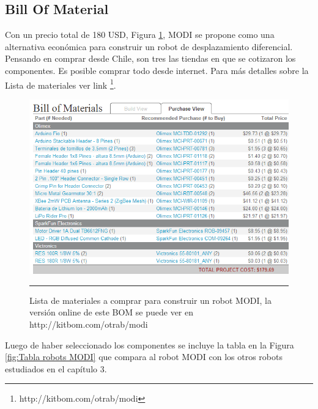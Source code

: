 
\subsection{Bill Of Material}

Con un precio total de 180 USD, Figura \ref{fig:BOM}, MODI se propone como una alternativa económica para construir un robot de desplazamiento diferencial. Pensando en comprar desde Chile, son tres las tiendas en que se cotizaron los componentes. Es posible comprar todo desde internet. Para más detalles sobre la Lista de materiales ver link \footnote{http://kitbom.com/otrab/modi}.
\begin{figure}[htbp]
	\centering
		\includegraphics[width=\textwidth]{./Figures/MODI/kitbom.png}
		\rule{35em}{0.5pt}
	\caption[Bill Of Materials]{Lista de materiales a comprar para construir un robot MODI, la versión online de este BOM se puede ver en http://kitbom.com/otrab/modi}
	\label{fig:BOM}
\end{figure}

Luego de haber seleccionado los componentes se incluye la tabla en la Figura \ref{fig:Tabla robots MODI} que compara al robot MODI con los otros robots estudiados en el capítulo 3.

